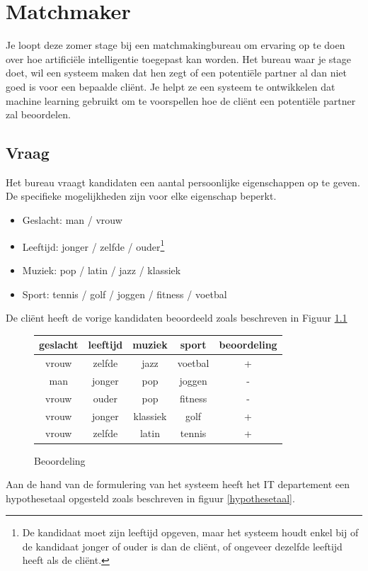 \documentclass[alternative-exam.tex]{subfiles}
\begin{document}
\chapter{Matchmaker}
Je loopt deze zomer stage bij een matchmakingbureau om ervaring op te doen over hoe artifici\"ele intelligentie toegepast kan worden.
Het bureau waar je stage doet, wil een systeem maken dat hen zegt of een potenti\"ele partner al dan niet goed is voor een bepaalde cli\"ent. Je helpt ze een systeem te ontwikkelen dat machine learning gebruikt om te voorspellen hoe de cli\"ent een potenti\"ele partner zal beoordelen.

\section{Vraag}
Het bureau vraagt kandidaten een aantal persoonlijke eigenschappen op te geven.
De specifieke mogelijkheden zijn voor elke eigenschap beperkt.
\begin{itemize}
\item Geslacht: man / vrouw
\item Leeftijd: jonger / zelfde / ouder\footnote{De kandidaat moet zijn leeftijd opgeven, maar het systeem houdt enkel bij of de kandidaat jonger of ouder is dan de cli\"ent, of ongeveer dezelfde leeftijd heeft als de cli\"ent.}
\item Muziek: pop / latin / jazz  / klassiek
\item Sport: tennis / golf / joggen / fitness / voetbal
\end{itemize}
De cli\"ent heeft de vorige kandidaten beoordeeld zoals beschreven in Figuur \ref{beoordeling}
\begin{figure}[H]
\centering
\caption{Beoordeling}
\label{beoordeling}
\begin{tabular}{|c|c|c|c|c|}
\hline
geslacht & leeftijd & muziek & sport & beoordeling\\
\hline
vrouw & zelfde & jazz & voetbal & +\\
man & jonger & pop & joggen & -\\%
vrouw & ouder & pop & fitness & -\\
vrouw & jonger & klassiek & golf & +\\
vrouw & zelfde & latin & tennis & +\\
\hline
\end{tabular}
\end{figure}
Aan de hand van de formulering van het systeem heeft het IT departement een hypothesetaal opgesteld zoals beschreven in figuur \ref{hypothesetaal}.
\end{document}
